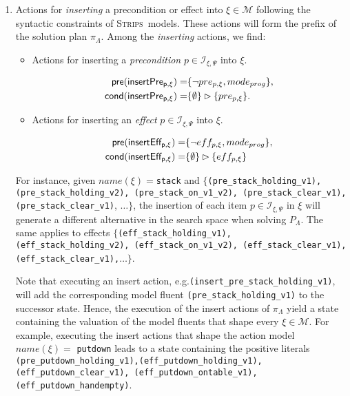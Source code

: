 \documentclass[runningheads]{llncs}
\newcommand{\pre}{\mathsf{pre}}     %
\newcommand{\cond}{\mathsf{cond}}   %
\newcommand{\strips}{\textsc{Strips}}     %
\begin{document}
\begin{itemize}
\begin{enumerate}
\item Actions for {\em inserting} a precondition or effect into $\xi \in \mathcal{M}$ following the syntactic constraints of \strips\ models. These actions will form the prefix of the solution plan $\pi_\Lambda$. Among the \emph{inserting} actions, we find:

\begin{itemize}
\item Actions for inserting a {\em precondition} $p\in{\mathcal I}_{\xi,\Psi}$ into $\xi$.
\begin{small}
\begin{align*}
\hspace*{7pt}\pre(\mathsf{insertPre_{p,\xi}})=&\{\neg pre_{p,\xi}, mode_{prog}\},\\
\cond(\mathsf{insertPre_{p,\xi}})=&\{\emptyset\}\rhd\{pre_{p,\xi}\}.
\end{align*}
\end{small}

\item Actions for inserting an {\em effect} $p\in{\mathcal I}_{\xi,\Psi}$ into $\xi$.
\begin{small}
\begin{align*}
\hspace*{7pt}\pre(\mathsf{insertEff_{p,\xi}})=&\{\neg eff_{p,\xi}, mode_{prog}\},\\
\cond(\mathsf{insertEff_{p,\xi}})=&\{\emptyset\}\rhd\{eff_{p,\xi}\}
\end{align*}
\end{small}
\end{itemize}

For instance, given $name(\xi)=${\tt{\small stack}} and $\{${\tt{\small (pre\_stack\_holding\_v1)}, {\tt\small (pre\_stack\_holding\_v2)}, {\tt\small(pre\_stack\_on\_v1\_v2)}, {\tt\small(pre\_stack\_clear\_v1)}, {\tt\small(pre\_stack\_clear\_v1)}}, $\ldots \}$, the insertion of each item $p \in {\mathcal I}_{\xi,\Psi}$ in $\xi$ will generate a different alternative in the search space when solving $P_{\Lambda}$. The same applies to effects $\{${\tt{\small (eff\_stack\_holding\_v1)}, {\tt\small(eff\_stack\_holding\_v2)}, {\tt\small (eff\_stack\_on\_v1\_v2)}, {\tt\small (eff\_stack\_clear\_v1)}, {\tt\small (eff\_stack\_clear\_v1),}}$\ldots \}$.

\vspace{0.1cm}

Note that executing an insert action, e.g.{\tt{\small (insert\_pre\_stack\_holding\_v1)}}, will add the corresponding model fluent {\tt{\small (pre\_stack\_holding\_v1)}} to the successor state. Hence, the execution of the insert actions of $\pi_\Lambda$ yield a state containing the valuation of the model fluents that shape every $\xi \in \mathcal{M}$. For example, executing the insert actions that shape the action model $name(\xi)=$ {\tt{\small putdown}} leads to a state containing the positive literals {\tt{\small (pre\_putdown\_holding\_v1),(eff\_putdown\_holding\_v1),\\ (eff\_putdown\_clear\_v1),
(eff\_putdown\_ontable\_v1),(eff\_putdown\_handempty)}}.


\end{enumerate}
\end{itemize}
\end{document}
